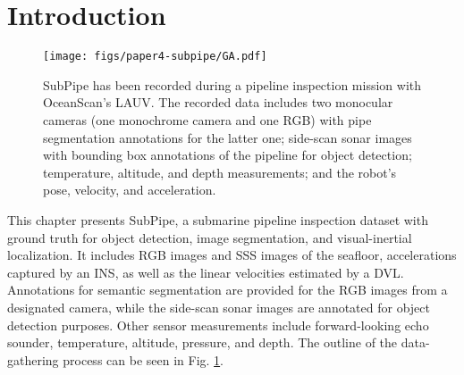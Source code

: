 \section{Introduction}
\label{sec:introduction}



\begin{figure}[!t]
    \centering
    \texttt{[image: figs/paper4-subpipe/GA.pdf]}
    \caption[Data captured and recorded through SubPipe's data gathering procedure]{SubPipe has been recorded during a pipeline inspection mission with OceanScan's LAUV. The recorded data includes two monocular cameras (one monochrome camera and one RGB) with pipe segmentation annotations for the latter one; side-scan sonar images with bounding box annotations of the pipeline for object detection; temperature, altitude, and depth measurements; and the robot's pose, velocity, and acceleration.}
    \label{fig:GA}
\end{figure}

This chapter presents SubPipe, a submarine pipeline inspection dataset with ground truth for object detection, image segmentation, and visual-inertial localization. It includes RGB images and  \ac{SSS} images of the seafloor, accelerations captured by an \ac{INS}, as well as the linear velocities estimated by a \ac{DVL}.  Annotations for semantic segmentation are provided for the RGB images from a designated camera, while the side-scan sonar images are annotated for object detection purposes.
Other sensor measurements include forward-looking echo sounder, temperature, altitude, pressure, and depth. The outline of the data-gathering process can be seen in Fig. \ref{fig:GA}.

